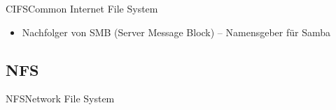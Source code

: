 \documentclass[pdflatex, ngerman]{beamer}
\begin{document}
\begin{frame}{CIFS}{Common Internet File System}

\begin{block}{}
  \begin{itemize}
    \item Nachfolger von SMB (Server Message Block) -- Namensgeber für Samba
  \end{itemize}
\end{block}

\end{frame}

\subsection{NFS}

\begin{frame}{NFS}{Network File System}

\end{frame}



\end{document}
